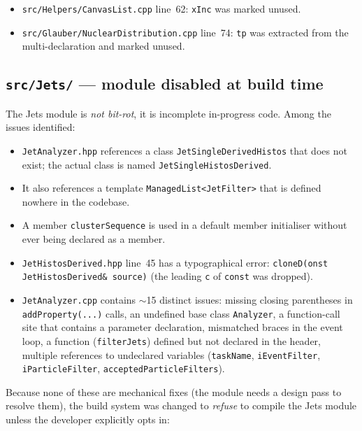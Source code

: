 \documentclass[11pt,a4paper]{article}
\begin{document}
\begin{itemize}[leftmargin=2em,itemsep=0pt]
  \item \texttt{src/Helpers/CanvasList.cpp} line~62: \texttt{xInc} was
        marked unused.
  \item \texttt{src/Glauber/NuclearDistribution.cpp} line~74: \texttt{tp}
        was extracted from the multi-declaration and marked unused.
\end{itemize}

\subsection{\texttt{src/Jets/} --- module disabled at build time}

The Jets module is \emph{not bit-rot}, it is incomplete in-progress code.
Among the issues identified:

\begin{itemize}[leftmargin=2em,itemsep=0pt]
  \item \texttt{JetAnalyzer.hpp} references a class
        \texttt{JetSingleDerivedHistos} that does not exist; the actual
        class is named \texttt{JetSingleHistosDerived}.
  \item It also references a template \texttt{ManagedList<JetFilter>} that
        is defined nowhere in the codebase.
  \item A member \texttt{clusterSequence} is used in a default member
        initialiser without ever being declared as a member.
  \item \texttt{JetHistosDerived.hpp} line~45 has a typographical error:
        \texttt{cloneD(onst JetHistosDerived\&~source)} (the leading
        \texttt{c} of \texttt{const} was dropped).
  \item \texttt{JetAnalyzer.cpp} contains $\sim$15 distinct issues: missing
        closing parentheses in \texttt{addProperty(...)} calls, an undefined
        base class \texttt{Analyzer}, a function-call site that contains a
        parameter declaration, mismatched braces in the event loop, a
        function (\texttt{filterJets}) defined but not declared in the
        header, multiple references to undeclared variables
        (\texttt{taskName}, \texttt{iEventFilter}, \texttt{iParticleFilter},
        \texttt{acceptedParticleFilters}).
\end{itemize}

\noindent
Because none of these are mechanical fixes (the module needs a design pass
to resolve them), the build system was changed to \emph{refuse} to compile
the Jets module unless the developer explicitly opts in:
\end{document}

